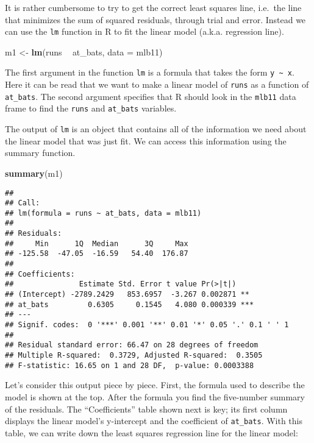 \documentclass[
]{article}
\newenvironment{Shaded}{\begin{snugshade}}{\end{snugshade}}
\newcommand{\DataTypeTok}[1]{\textcolor[rgb]{0.13,0.29,0.53}{#1}}
\newcommand{\KeywordTok}[1]{\textcolor[rgb]{0.13,0.29,0.53}{\textbf{#1}}}
\newcommand{\NormalTok}[1]{#1}
\newcommand{\OperatorTok}[1]{\textcolor[rgb]{0.81,0.36,0.00}{\textbf{#1}}}
\newcommand{\StringTok}[1]{\textcolor[rgb]{0.31,0.60,0.02}{#1}}
\begin{document}
It is rather cumbersome to try to get the correct least squares line,
i.e.~the line that minimizes the sum of squared residuals, through trial
and error. Instead we can use the \texttt{lm} function in R to fit the
linear model (a.k.a. regression line).

\begin{Shaded}
\begin{Highlighting}[]
\NormalTok{m1 <-}\StringTok{ }\KeywordTok{lm}\NormalTok{(runs }\OperatorTok{~}\StringTok{ }\NormalTok{at_bats, }\DataTypeTok{data =}\NormalTok{ mlb11)}
\end{Highlighting}
\end{Shaded}

The first argument in the function \texttt{lm} is a formula that takes
the form \texttt{y\ \textasciitilde{}\ x}. Here it can be read that we
want to make a linear model of \texttt{runs} as a function of
\texttt{at\_bats}. The second argument specifies that R should look in
the \texttt{mlb11} data frame to find the \texttt{runs} and
\texttt{at\_bats} variables.

The output of \texttt{lm} is an object that contains all of the
information we need about the linear model that was just fit. We can
access this information using the summary function.

\begin{Shaded}
\begin{Highlighting}[]
\KeywordTok{summary}\NormalTok{(m1)}
\end{Highlighting}
\end{Shaded}

\begin{verbatim}
## 
## Call:
## lm(formula = runs ~ at_bats, data = mlb11)
## 
## Residuals:
##     Min      1Q  Median      3Q     Max 
## -125.58  -47.05  -16.59   54.40  176.87 
## 
## Coefficients:
##               Estimate Std. Error t value Pr(>|t|)    
## (Intercept) -2789.2429   853.6957  -3.267 0.002871 ** 
## at_bats         0.6305     0.1545   4.080 0.000339 ***
## ---
## Signif. codes:  0 '***' 0.001 '**' 0.01 '*' 0.05 '.' 0.1 ' ' 1
## 
## Residual standard error: 66.47 on 28 degrees of freedom
## Multiple R-squared:  0.3729, Adjusted R-squared:  0.3505 
## F-statistic: 16.65 on 1 and 28 DF,  p-value: 0.0003388
\end{verbatim}

Let's consider this output piece by piece. First, the formula used to
describe the model is shown at the top. After the formula you find the
five-number summary of the residuals. The ``Coefficients'' table shown
next is key; its first column displays the linear model's y-intercept
and the coefficient of \texttt{at\_bats}. With this table, we can write
down the least squares regression line for the linear model:
\end{document}
